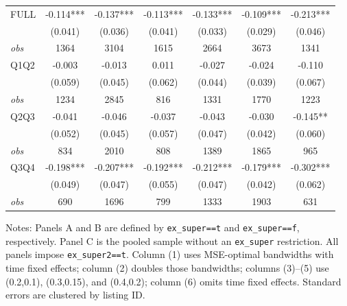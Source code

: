 \begin{table}[!htbp]
\begin{tabular}{lcccccc}
FULL & -0.114*** & -0.137*** & -0.113*** & -0.133*** & -0.109*** & -0.213*** \\
 & (0.041) & (0.036) & (0.041) & (0.033) & (0.029) & (0.046) \\
\textit{obs} & 1364 & 3104 & 1615 & 2664 & 3673 & 1341 \\
Q1Q2 & -0.003 & -0.013 & 0.011 & -0.027 & -0.024 & -0.110 \\
 & (0.059) & (0.045) & (0.062) & (0.044) & (0.039) & (0.067) \\
\textit{obs} & 1234 & 2845 & 816 & 1331 & 1770 & 1223 \\
Q2Q3 & -0.041 & -0.046 & -0.037 & -0.043 & -0.030 & -0.145** \\
 & (0.052) & (0.045) & (0.057) & (0.047) & (0.042) & (0.060) \\
\textit{obs} & 834 & 2010 & 808 & 1389 & 1865 & 965 \\
Q3Q4 & -0.198*** & -0.207*** & -0.192*** & -0.212*** & -0.179*** & -0.302*** \\
 & (0.049) & (0.047) & (0.055) & (0.047) & (0.042) & (0.062) \\
\textit{obs} & 690 & 1696 & 799 & 1333 & 1903 & 631 \\
\bottomrule
\end{tabular}
\begin{minipage}{0.98\textwidth}\footnotesize
Notes: Panels A and B are defined by \texttt{ex\_super==t} and \texttt{ex\_super==f}, respectively. Panel C is the pooled sample without an \texttt{ex\_super} restriction. All panels impose \texttt{ex\_super2==t}. Column (1) uses MSE-optimal bandwidths with time fixed effects; column (2) doubles those bandwidths; columns (3)--(5) use (0.2,0.1), (0.3,0.15), and (0.4,0.2); column (6) omits time fixed effects. Standard errors are clustered by listing ID.
\end{minipage}
\end{table}

